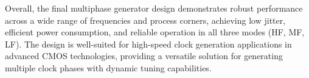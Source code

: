 Overall, the final multiphase generator design demonstrates robust performance across a wide range of frequencies and process corners, achieving low jitter, efficient power consumption, and reliable operation in all three modes (HF, MF, LF). The design is well-suited for high-speed clock generation applications in advanced CMOS technologies, providing a versatile solution for generating multiple clock phases with dynamic tuning capabilities.